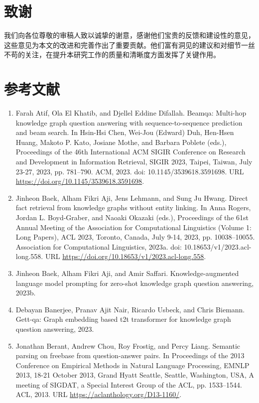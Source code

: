 \documentclass[11pt,UTF8,fontset=fandol]{ctexart}
\begin{document}
\section{致谢}

我们向各位尊敬的审稿人致以诚挚的谢意，感谢他们宝贵的反馈和建设性的意见，这些意见为本文的改进和完善作出了重要贡献。他们富有洞见的建议和对细节一丝不苟的关注，在提升本研究工作的质量和清晰度方面发挥了关键作用。

\section*{参考文献}
\begin{enumerate}[leftmargin=2em]
\small
\item Farah Atif, Ola El Khatib, and Djellel Eddine Difallah. Beamqa: Multi-hop knowledge graph question answering with sequence-to-sequence prediction and beam search. In Hsin-Hsi Chen, Wei-Jou (Edward) Duh, Hen-Hsen Huang, Makoto P. Kato, Josiane Mothe, and Barbara Poblete (eds.), Proceedings of the 46th International ACM SIGIR Conference on Research and Development in Information Retrieval, SIGIR 2023, Taipei, Taiwan, July 23-27, 2023, pp. 781--790. ACM, 2023. doi: 10.1145/3539618.3591698. URL \url{https://doi.org/10.1145/3539618.3591698}.
\item Jinheon Baek, Alham Fikri Aji, Jens Lehmann, and Sung Ju Hwang. Direct fact retrieval from knowledge graphs without entity linking. In Anna Rogers, Jordan L. Boyd-Graber, and Naoaki Okazaki (eds.), Proceedings of the 61st Annual Meeting of the Association for Computational Linguistics (Volume 1: Long Papers), ACL 2023, Toronto, Canada, July 9-14, 2023, pp. 10038--10055. Association for Computational Linguistics, 2023a. doi: 10.18653/v1/2023.acl-long.558. URL \url{https://doi.org/10.18653/v1/2023.acl-long.558}.
\item Jinheon Baek, Alham Fikri Aji, and Amir Saffari. Knowledge-augmented language model prompting for zero-shot knowledge graph question answering, 2023b.
\item Debayan Banerjee, Pranav Ajit Nair, Ricardo Usbeck, and Chris Biemann. Gett-qa: Graph embedding based t2t transformer for knowledge graph question answering, 2023.
\item Jonathan Berant, Andrew Chou, Roy Frostig, and Percy Liang. Semantic parsing on freebase from question-answer pairs. In Proceedings of the 2013 Conference on Empirical Methods in Natural Language Processing, EMNLP 2013, 18-21 October 2013, Grand Hyatt Seattle, Seattle, Washington, USA, A meeting of SIGDAT, a Special Interest Group of the ACL, pp. 1533--1544. ACL, 2013. URL \url{https://aclanthology.org/D13-1160/}.

\end{enumerate}
\end{document}
